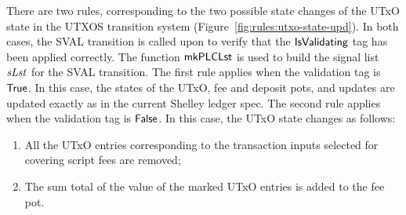 There are two rules, corresponding to the two possible state changes of the
UTxO state in the UTXOS transition system (Figure~\ref{fig:rules:utxo-state-upd}).
%
In both cases, the SVAL transition is called upon to verify that the $\mathsf{IsValidating}$
tag has been applied correctly. The function $\mathsf{mkPLCLst}$ is used to build
the signal list $\mathit{sLst}$ for the SVAL transition.
%
The first rule
applies when the validation tag is $\mathsf{True}$.
In this case, the states of the UTxO, fee
  and deposit pots, and updates are updated exactly as in the current Shelley
  ledger spec.
%
  The second rule
  applies when the validation tag is $\mathsf{False}$.
  In this case, the UTxO state changes as follows:

  \begin{enumerate}
    \item All the
    UTxO entries corresponding to the transaction inputs selected for covering
    script fees are removed;

    \item The sum total of the value of the marked UTxO entries
    is added to the fee pot.
  \end{enumerate}


